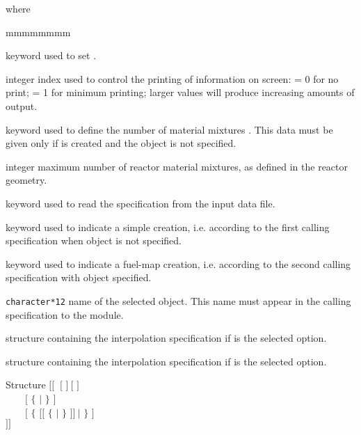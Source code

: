 \goodbreak
\noindent where
\begin{ListeDeDescription}{mmmmmmmm}

\item[\moc{EDIT}] keyword used to set .

\item[\dusa{iprint}] integer index used to control the printing of
information on screen: = 0 for no print; = 1 for minimum printing;
larger values will produce increasing amounts of output.

\item[\moc{NMIX}] keyword used to define the number of material
mixtures . This data must be given only if 
is created and the  object is not specified.

\item[\dusa{nmix}] integer maximum number of reactor material mixtures,
as defined in the reactor geometry.

\item[\moc{READ}] keyword used to read the  specification
from the input data file.

\item[\moc{COMPO}] keyword used to indicate a simple  creation,
i.e. according to the first calling specification when  object is not specified.

\item[\moc{TABLE}] keyword used to indicate a fuel-map  creation,
i.e. according to the second calling specification with  object specified.

\item[\dusa{CPO}] \texttt{character*12} name of the selected  object.
This name must appear in the calling specification to the  module.

\item[\dstr{descdata1}] structure containing the interpolation specification if
 is the selected option.

\item[\dstr{descdata2}] structure containing the interpolation specification if
 is the selected option.

\end{ListeDeDescription}

\begin{DataStructure}{Structure }
$[[$    $~[$  $]~[$  $]$ \\
~~~~$[$ $\{$   $|$    $\}$ $]$ \\
~~~~$[$  $\{$ $[[$  $\{$  $|$ \moc{*} $\}$ $]]~|$  $\}$ $]$ \\
 $]]$
\end{DataStructure}

